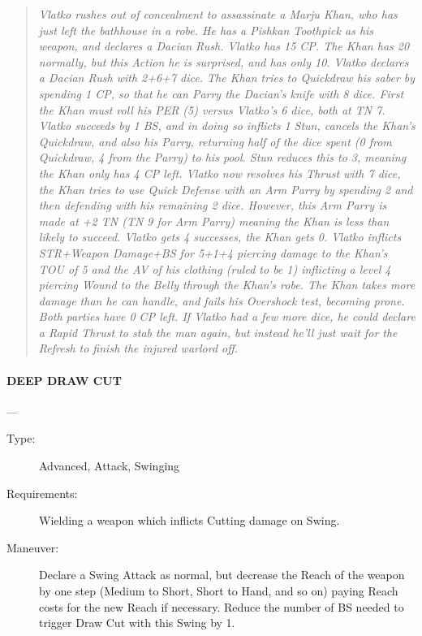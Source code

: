 \documentclass[oneside,11pt,english]{book}
\begin{document}
\begin{quotation}
\emph{Vlatko rushes out of concealment to assassinate a Marju Khan, who has just left the bathhouse in a robe. He has a Pishkan Toothpick as his weapon, and declares a Dacian Rush. Vlatko has 15 CP. The Khan has 20 normally, but this Action he is surprised, and has only 10. Vlatko declares a Dacian Rush with 2+6+7 dice. The Khan tries to Quickdraw his saber by spending 1 CP, so that he can Parry the Dacian's knife with 8 dice. First the Khan must roll his PER (5) versus Vlatko's 6 dice, both at TN 7. Vlatko succeeds by 1 BS, and in doing so inflicts 1 Stun, cancels the Khan's Quickdraw, and also his Parry, returning half of the dice spent (0 from Quickdraw, 4 from the Parry) to his pool. Stun reduces this to 3, meaning the Khan only has 4 CP left. Vlatko now resolves his Thrust with 7 dice, the Khan tries to use Quick Defense with an Arm Parry by spending 2 and then defending with his remaining 2 dice. However, this Arm Parry is made at +2 TN (TN 9 for Arm Parry) meaning the Khan is less than likely to succeed. Vlatko gets 4 successes, the Khan gets 0. Vlatko inflicts STR+Weapon Damage+BS for 5+1+4 piercing damage to the Khan’s TOU of 5 and the AV of his clothing (ruled to be 1) inflicting a level 4 piercing Wound to the Belly through the Khan's robe. The Khan takes more damage than he can handle, and fails his Overshock test, becoming prone. Both parties have 0 CP left. If Vlatko had a few more dice, he could declare a Rapid Thrust to stab the man again, but instead he'll just wait for the Refresh to finish the injured warlord off.}
\end{quotation}

\paragraph{\large\label{man:DEEP DRAW CUT} DEEP DRAW CUT}---\quad{\large[0]}
\vspace{-10pt}\begin{description}
\item [Type:] Advanced, Attack, Swinging 
\item [Requirements:] Wielding a weapon which inflicts Cutting damage on Swing. 
\item [Maneuver:] Declare a Swing Attack as normal, but decrease the Reach of the weapon by one step (Medium to Short, Short to Hand, and so on) paying Reach costs for the new Reach if necessary. Reduce the number of BS needed to trigger Draw Cut with this Swing by 1.
\end{description}
\end{document}
